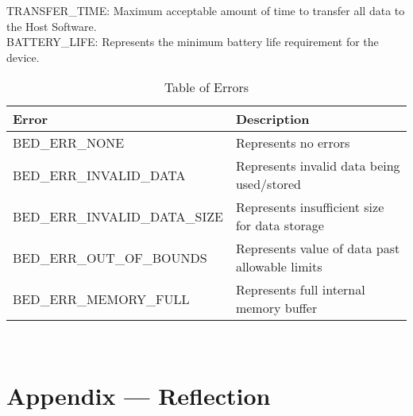 \documentclass[12pt, titlepage]{article}
\begin{document}
TRANSFER\_TIME: Maximum acceptable amount of time to transfer all data to the Host Software.\\
BATTERY\_LIFE: Represents the minimum battery life requirement for the device.\\


\begin{flushleft} 
	\begin{table}[H]
		\begin{tabular}{l l} 
			  \toprule		
				  \textbf{Error} & \textbf{Description}\\
				  \midrule 
				  BED\_ERR\_NONE 					& Represents no errors\\
				  BED\_ERR\_INVALID\_DATA			& Represents invalid data being used/stored\\
				  BED\_ERR\_INVALID\_DATA\_SIZE 		& Represents insufficient size for data storage\\
				  BED\_ERR\_OUT\_OF\_BOUNDS 		& Represents value of data past allowable limits\\
				  BED\_ERR\_MEMORY\_FULL 			& Represents full internal memory buffer\\
		
			  \bottomrule
		\end{tabular}\\
		\caption{\label{Err}Table of Errors}

	\end{table}
\end{flushleft} 


\newpage{}
\section*{Appendix --- Reflection}
\end{document}
